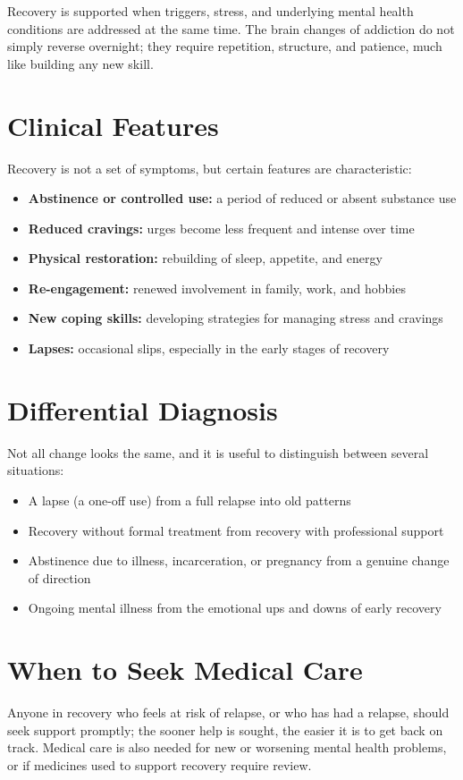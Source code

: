 Recovery is supported when triggers, stress, and underlying mental health conditions are addressed at the same time. The brain changes of addiction do not simply reverse overnight; they require repetition, structure, and patience, much like building any new skill.

\section*{Clinical Features}
Recovery is not a set of symptoms, but certain features are characteristic:

\begin{itemize}
    \item \textbf{Abstinence or controlled use:} a period of reduced or absent substance use
    \item \textbf{Reduced cravings:} urges become less frequent and intense over time
    \item \textbf{Physical restoration:} rebuilding of sleep, appetite, and energy
    \item \textbf{Re-engagement:} renewed involvement in family, work, and hobbies
    \item \textbf{New coping skills:} developing strategies for managing stress and cravings
    \item \textbf{Lapses:} occasional slips, especially in the early stages of recovery
\end{itemize}

\section*{Differential Diagnosis}
Not all change looks the same, and it is useful to distinguish between several situations:

\begin{itemize}
    \item A lapse (a one-off use) from a full relapse into old patterns
    \item Recovery without formal treatment from recovery with professional support
    \item Abstinence due to illness, incarceration, or pregnancy from a genuine change of direction
    \item Ongoing mental illness from the emotional ups and downs of early recovery
\end{itemize}

\section*{When to Seek Medical Care}
Anyone in recovery who feels at risk of relapse, or who has had a relapse, should seek support promptly; the sooner help is sought, the easier it is to get back on track. Medical care is also needed for new or worsening mental health problems, or if medicines used to support recovery require review.


